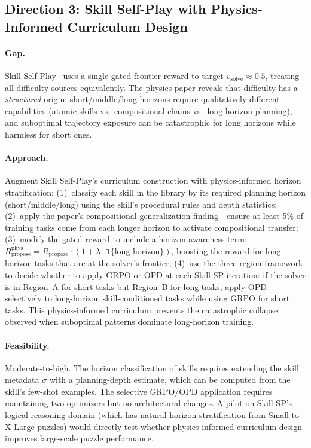 \documentclass[11pt,a4paper]{article}
\begin{document}
\subsection{Direction 3: Skill Self-Play with Physics-Informed Curriculum Design}

\paragraph{Gap.}
Skill Self-Play~\cite{huang2026skillsp} uses a single gated frontier reward to target $v_{\text{solve}} \approx 0.5$, treating all difficulty sources equivalently. The physics paper reveals that difficulty has a \emph{structured} origin: short/middle/long horizons require qualitatively different capabilities (atomic skills vs.\ compositional chains vs.\ long-horizon planning), and suboptimal trajectory exposure can be catastrophic for long horizons while harmless for short ones.

\paragraph{Approach.}
Augment Skill Self-Play's curriculum construction with physics-informed horizon stratification: (1)~classify each skill in the library by its required planning horizon (short/middle/long) using the skill's procedural rules and depth statistics; (2)~apply the paper's compositional generalization finding---ensure at least 5\% of training tasks come from each longer horizon to activate compositional transfer; (3)~modify the gated reward to include a horizon-awareness term: $R_{\text{propose}}^{\text{phys}} = R_{\text{propose}} \cdot (1 + \lambda \cdot \mathbf{1}\{\text{long-horizon}\})$, boosting the reward for long-horizon tasks that are at the solver's frontier; (4)~use the three-region framework to decide whether to apply GRPO or OPD at each Skill-SP iteration: if the solver is in Region~A for short tasks but Region~B for long tasks, apply OPD selectively to long-horizon skill-conditioned tasks while using GRPO for short tasks. This physics-informed curriculum prevents the catastrophic collapse observed when suboptimal patterns dominate long-horizon training.

\paragraph{Feasibility.}
Moderate-to-high. The horizon classification of skills requires extending the skill metadata $\sigma$ with a planning-depth estimate, which can be computed from the skill's few-shot examples. The selective GRPO/OPD application requires maintaining two optimizers but no architectural changes. A pilot on Skill-SP's logical reasoning domain (which has natural horizon stratification from Small to X-Large puzzles) would directly test whether physics-informed curriculum design improves large-scale puzzle performance.
\end{document}
